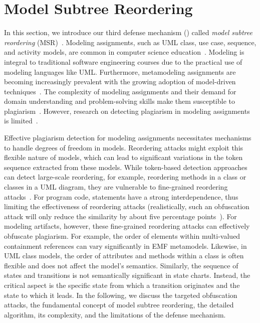 \section{Model Subtree Reordering}\label{sec:msr}
In this section, we introduce our third defense mechanism () called \textit{model subtree reordering} (MSR)~\cite{Saglam2024a}. 
%
Modeling assignments, such as \ac{UML} class, use case, sequence, and activity models, are common in computer science education~\cite{Ciccozzi2018, Saglam2023}. Modeling is integral to traditional software engineering courses due to the practical use of modeling languages like \ac{UML}. Furthermore, metamodeling assignments are becoming increasingly prevalent with the growing adoption of model-driven techniques~\cite{Brambilla2017, Hutchinson2011}. The complexity of modeling assignments and their demand for domain understanding and problem-solving skills make them susceptible to plagiarism~\cite{Martinez2020}. However, research on detecting plagiarism in modeling assignments is limited~\cite{Martinez2020, Saglam2022, Saglam2023}.

Effective plagiarism detection for modeling assignments necessitates mechanisms to handle degrees of freedom in models. Reordering attacks might exploit this flexible nature of models, which can lead to significant variations in the token sequence extracted from these models. While token-based detection approaches can detect large-scale reordering, for example, reordering methods in a class or classes in a \ac{UML} diagram, they are vulnerable to fine-grained reordering attacks~\cite{Saglam2022}. For program code, statements have a strong interdependence, thus limiting the effectiveness of reordering attacks (realistically, such an obfuscation attack will only reduce the similarity by about five percentage points~\cite{Saglam2024b}). For modeling artifacts, however, these fine-grained reordering attacks can effectively obfuscate plagiarism.
%
For example, the order of elements within multi-valued containment references can vary significantly in \ac{EMF} metamodels.
Likewise, in \ac{UML} class models, the order of attributes and methods within a class is often flexible and does not affect the model's semantics. Similarly, the sequence of states and transitions is not semantically significant in state charts. Instead, the critical aspect is the specific state from which a transition originates and the state to which it leads.
%
In the following, we discuss the targeted obfuscation attacks, the fundamental concept of model subtree reordering, the detailed algorithm, its complexity, and the limitations of the defense mechanism.

